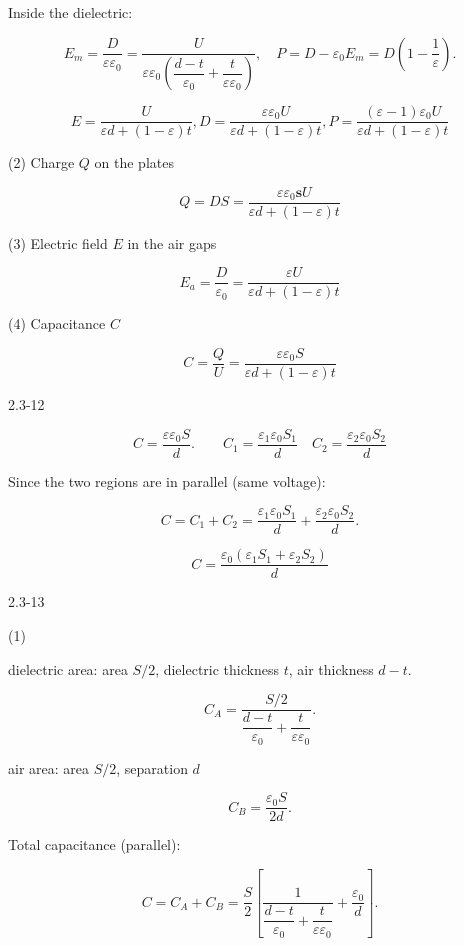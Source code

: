 \documentclass{article}
\begin{document}
Inside the dielectric:

$$
E_m = \frac{D}{\varepsilon\varepsilon_0} = \frac{U}{\varepsilon\varepsilon_0 \left( \dfrac{d-t}{\varepsilon_0} + \dfrac{t}{\varepsilon\varepsilon_0} \right)},\quad
P = D - \varepsilon_0 E_m = D\left( 1 - \frac{1}{\varepsilon} \right).
$$

$$E=\frac{U}{\varepsilon d+\left(1-\varepsilon\right)t},D=\frac{\varepsilon\varepsilon_0U}{\varepsilon d+\left(1-\varepsilon\right)t},P=\frac{\left(\varepsilon-1\right)\varepsilon_0U}{\varepsilon d+\left(1-\varepsilon\right)t}$$

(2) Charge $ Q $ on the plates

$$Q = D S = \frac{\varepsilon\varepsilon_0\boldsymbol{s}U}{\varepsilon d+(1-\varepsilon)t}$$

(3) Electric field $ E $ in the air gaps

$$E_a = \frac{D}{\varepsilon_0} = \frac{\varepsilon U}{\varepsilon d+(1-\varepsilon)t}$$

(4) Capacitance $ C $

$$C = \frac{Q}{U} =\frac{\varepsilon\varepsilon_0S}{\varepsilon d+(1-\varepsilon)t}$$


\newpage

2.3-12

   $$C = \frac{\varepsilon\varepsilon_0 S}{d}.\qquad C_1 = \dfrac{\varepsilon_1\varepsilon_0 S_1}{d} \quad C_2 = \dfrac{\varepsilon_2\varepsilon_0 S_2}{d} $$


   Since the two regions are in parallel (same voltage):

   $$C = C_1 + C_2 = \frac{\varepsilon_1\varepsilon_0 S_1}{d} + \frac{\varepsilon_2\varepsilon_0 S_2}{d}.$$

  $$ C = \frac{\varepsilon_0(\varepsilon_1 S_1 + \varepsilon_2 S_2)}{d} $$


\newpage

2.3-13


(1) 

dielectric area: area $ S/2 $, dielectric thickness $ t $, air thickness $ d-t $.  

  $$  C_A = \frac{S/2}{\dfrac{d-t}{\varepsilon_0} + \dfrac{t}{\varepsilon\varepsilon_0}}.$$

air area: area $ S/2 $, separation $ d $

  $$C_B = \frac{\varepsilon_0 S}{2d}.$$

Total capacitance (parallel):

$$C = C_A + C_B = \frac{S}{2} \left[ \frac{1}{\dfrac{d-t}{\varepsilon_0} + \dfrac{t}{\varepsilon\varepsilon_0}} + \frac{\varepsilon_0}{d} \right].$$
\end{document}
